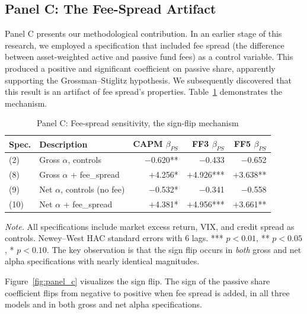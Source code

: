 \documentclass[11pt, a4paper]{article}
\begin{document}
\subsection{Panel C: The Fee-Spread Artifact}
\label{subsec:panel_c}

Panel C presents our methodological contribution. In an earlier stage of this research, we employed a specification that included fee spread (the difference between asset-weighted active and passive fund fees) as a control variable. This produced a positive and significant coefficient on passive share, apparently supporting the Grossman--Stiglitz hypothesis. We subsequently discovered that this result is an artifact of fee spread's properties. Table~\ref{tab:panel_c} demonstrates the mechanism.

\begin{table}[H]
\centering
\caption{Panel C: Fee-spread sensitivity, the sign-flip mechanism}
\label{tab:panel_c}
\small
\begin{tabular}{llrrr}
\toprule
\textbf{Spec.} & \textbf{Description} & \textbf{CAPM $\beta_{PS}$} & \textbf{FF3 $\beta_{PS}$} & \textbf{FF5 $\beta_{PS}$} \\
\midrule
(2) & Gross $\alpha$, controls              & $-$0.620**   & $-$0.433     & $-$0.652     \\
(8) & Gross $\alpha$ + fee\_spread          & $+$4.256*    & $+$4.926***  & $+$3.638**   \\
(9) & Net $\alpha$, controls (no fee)       & $-$0.532*    & $-$0.341     & $-$0.558     \\
(10)& Net $\alpha$ + fee\_spread            & $+$4.381*    & $+$4.956***  & $+$3.661**   \\
\bottomrule
\end{tabular}
\begin{flushleft}
\small\textit{Note.} All specifications include market excess return, VIX, and credit spread as controls. Newey--West HAC standard errors with 6 lags. *** $p<0.01$, ** $p<0.05$, * $p<0.10$. The key observation is that the sign flip occurs in \textit{both} gross and net alpha specifications with nearly identical magnitudes.
\end{flushleft}
\end{table}

Figure~\ref{fig:panel_c} visualizes the sign flip. The sign of the passive share coefficient flips from negative to positive when fee spread is added, in all three models and in both gross and net alpha specifications.
\end{document}
